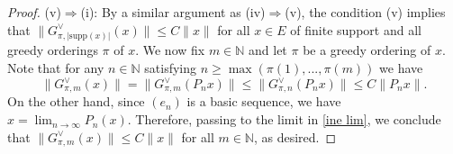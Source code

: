 \documentclass[12pt,leqno]{amsart}
\numberwithin{equation}{section}
\theoremstyle{definition}
\def\N{{\mathbb N}}
\begin{document}
\begin{proof}
(v)$\Rightarrow$(i): By a similar argument as (iv)$\Rightarrow$(v), the condition (v) implies that 
$\|G_{\pi,|\text{supp}(x)|}^\vee(x)\|\leq C\|x\|$ for all $x\in E$ of finite support and all greedy orderings $\pi$ of $x$. We now fix $m\in\N$ and let $\pi$ be a greedy ordering of $x$. Note that for any $n\in\N$ satisfying $n\geq \max(\pi(1),...,\pi(m))$ we have  
\begin{equation}\label{ine lim}
    \|G_{\pi,m}^\vee(x)\|=\|G_{\pi,m}^\vee(P_n x)\|\leq \|G_{\pi,n}^\vee(P_n x)\|\leq C\|P_n x\|.
\end{equation}
On the other hand, since $(e_n)$ is a basic sequence, we have $x=\lim_{n\rightarrow\infty }P_n(x)$. Therefore, passing to the limit in \eqref{ine lim}, we conclude that $\|G_{\pi,m}^\vee(x)\|\leq C\|x\|$ for all $m\in\N$, as desired.



\end{proof}
\end{document}
